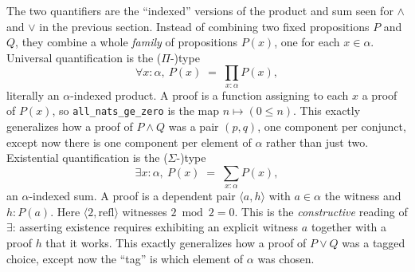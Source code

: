 \begin{mathreading}

The two quantifiers are the ``indexed'' versions of the product and sum seen for \(\wedge\) and \(\vee\) in the previous section. Instead of combining two fixed propositions \(P\) and \(Q\), they combine a whole \emph{family} of propositions \(P(x)\), one for each \(x \in \alpha\). Universal quantification is the (\(\Pi\)-)type \[
\forall x{:}\alpha,\ P(x) \;=\; \prod_{x : \alpha} P(x),
\] literally an \(\alpha\)-indexed product. A proof is a function assigning to each \(x\) a proof of \(P(x)\), so \texttt{all\_\allowbreak{}nats\_\allowbreak{}ge\_\allowbreak{}zero} is the map \(n \mapsto (0 \le n)\). This exactly generalizes how a proof of \(P \wedge Q\) was a pair \((p, q)\), one component per conjunct, except now there is one component per element of \(\alpha\) rather than just two. Existential quantification is the (\(\Sigma\)-)type \[
\exists x{:}\alpha,\ P(x) \;=\; \sum_{x : \alpha} P(x),
\] an \(\alpha\)-indexed sum. A proof is a dependent pair \(\langle a, h\rangle\) with \(a \in \alpha\) the witness and \(h : P(a)\). Here \(\langle 2, \mathrm{refl}\rangle\) witnesses \(2 \bmod 2 = 0\). This is the \emph{constructive} reading of \(\exists\): asserting existence requires exhibiting an explicit witness \(a\) together with a proof \(h\) that it works. This exactly generalizes how a proof of \(P \vee Q\) was a tagged choice, except now the ``tag'' is which element of \(\alpha\) was chosen.

\end{mathreading}
